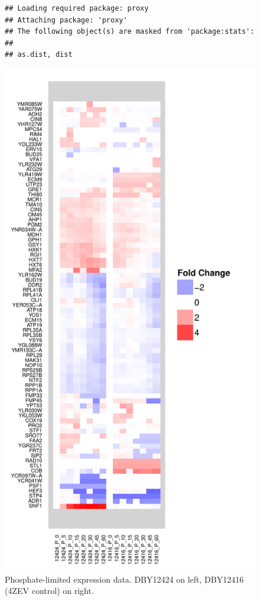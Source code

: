 \documentclass[letter]{article}\usepackage{graphicx, color}
\makeatletter
\def\maxwidth{ %
  \ifdim\Gin@nat@width>\linewidth
    \linewidth
  \else
    \Gin@nat@width
  \fi
}
\newenvironment{kframe}{%
 \def\FrameCommand##1{\hskip\@totalleftmargin \hskip-\fboxsep
 \colorbox{shadecolor}{##1}\hskip-\fboxsep
     \hskip-\linewidth \hskip-\@totalleftmargin \hskip\columnwidth}%
 \MakeFramed {\advance\hsize-\width
   \@totalleftmargin\z@ \linewidth\hsize
   \@setminipage}}%
 {\par\unskip\endMakeFramed}
\newenvironment{knitrout}{}{} %
\makeatother
\begin{document}
\begin{figure}[hbtp]
\centering
\begin{knitrout}
\color{fgcolor}\begin{kframe}
\begin{verbatim}
## Loading required package: proxy
## Attaching package: 'proxy'
## The following object(s) are masked from 'package:stats':
## 
## as.dist, dist
\end{verbatim}
\end{kframe}\includegraphics[width=\maxwidth]{figure/p1} 
\end{knitrout}

\caption{Phosphate-limited expression data. DBY12424 on left, DBY12416 (4ZEV control) on right.}
\end{figure}
\end{document}
